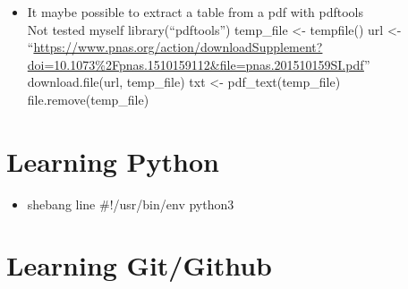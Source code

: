 \documentclass[
]{book}
\providecommand{\tightlist}{%
  \setlength{\itemsep}{0pt}\setlength{\parskip}{0pt}}
\begin{document}
\begin{itemize}
\tightlist
\item
  It maybe possible to extract a table from a pdf with pdftools\\
  Not tested myself
  library(``pdftools'')
  temp\_file \textless- tempfile()
  url \textless- ``\url{https://www.pnas.org/action/downloadSupplement?doi=10.1073\%2Fpnas.1510159112\&file=pnas.201510159SI.pdf}''
  download.file(url, temp\_file)
  txt \textless- pdf\_text(temp\_file)
  file.remove(temp\_file)
\end{itemize}

\hypertarget{learning-python}{%
\chapter{Learning Python}\label{learning-python}}

\begin{itemize}
\tightlist
\item
  shebang line
  \#!/usr/bin/env python3
\end{itemize}

\hypertarget{learning-gitgithub}{%
\chapter{Learning Git/Github}\label{learning-gitgithub}}
\end{document}
